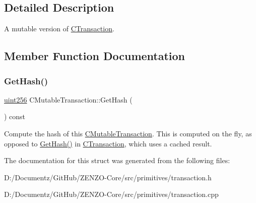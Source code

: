 \subsection{Detailed Description}
A mutable version of \mbox{\hyperlink{class_c_transaction}{C\+Transaction}}. 

\subsection{Member Function Documentation}
\mbox{\label{struct_c_mutable_transaction_a52799a4ca4831f56532c1c0bcb110721}} 
\subsubsection{\texorpdfstring{GetHash()}{GetHash()}}
{\footnotesize\ttfamily \mbox{\hyperlink{classuint256}{uint256}} C\+Mutable\+Transaction\+::\+Get\+Hash (\begin{DoxyParamCaption}{ }\end{DoxyParamCaption}) const}

Compute the hash of this \mbox{\hyperlink{struct_c_mutable_transaction}{C\+Mutable\+Transaction}}. This is computed on the fly, as opposed to \mbox{\hyperlink{struct_c_mutable_transaction_a52799a4ca4831f56532c1c0bcb110721}{Get\+Hash()}} in \mbox{\hyperlink{class_c_transaction}{C\+Transaction}}, which uses a cached result. 

The documentation for this struct was generated from the following files\+:\begin{DoxyCompactItemize}
\item 
D\+:/\+Documentz/\+Git\+Hub/\+Z\+E\+N\+Z\+O-\/\+Core/src/primitives/transaction.\+h\item 
D\+:/\+Documentz/\+Git\+Hub/\+Z\+E\+N\+Z\+O-\/\+Core/src/primitives/transaction.\+cpp\end{DoxyCompactItemize}

